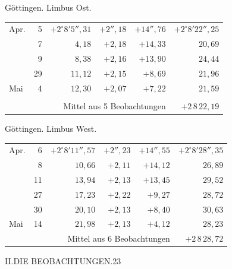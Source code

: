 \noindent\begin{minipage}[t]{.495\textwidth}\centering Göttingen. Limbus Ost.\par\smallskip
{\scriptsize\setlength{\tabcolsep}{1pt}\renewcommand{\arraystretch}{1.2}\begin{tabular}{lr|r|r|r|r|}
Apr.&5&$+2^\circ8'5''{,}31$&$+2''{,}18$&$+14''{,}76$&$+2^\circ8'22''{,}25$\\
&7&$4{,}18$&$+2{,}18$&$+14{,}33$&$20{,}69$\\
&9&$8{,}38$&$+2{,}16$&$+13{,}90$&$24{,}44$\\
&29&$11{,}12$&$+2{,}15$&$+8{,}69$&$21{,}96$\\
Mai&4&$12{,}30$&$+2{,}07$&$+7{,}22$&$21{,}59$\\
&&&&&\\
\cline{6-6}\multicolumn{5}{r}{Mittel aus 5 Beobachtungen}&$+2\,8\,22{,}19$
\end{tabular}}\end{minipage}\hfill\begin{minipage}[t]{.495\textwidth}\centering Göttingen. Limbus West.\par\smallskip
{\scriptsize\setlength{\tabcolsep}{1pt}\renewcommand{\arraystretch}{1.2}\begin{tabular}{lr|r|r|r|r}
Apr.&6&$+2^\circ8'11''{,}57$&$+2''{,}23$&$+14''{,}55$&$+2^\circ8'28''{,}35$\\
&8&$10{,}66$&$+2{,}11$&$+14{,}12$&$26{,}89$\\
&11&$13{,}94$&$+2{,}13$&$+13{,}45$&$29{,}52$\\
&27&$17{,}23$&$+2{,}22$&$+9{,}27$&$28{,}72$\\
&30&$20{,}10$&$+2{,}13$&$+8{,}40$&$30{,}63$\\
Mai&14&$21{,}98$&$+2{,}13$&$+4{,}12$&$28{,}23$\\
\cline{6-6}\multicolumn{5}{r}{Mittel aus 6 Beobachtungen}&$+2\,8\,28{,}72$
\end{tabular}}\end{minipage}
\par\vspace{4mm}

\clearpage
\noindent\mbox{}\hfill II.\quad DIE BEOBACHTUNGEN.\hfill 23\par

